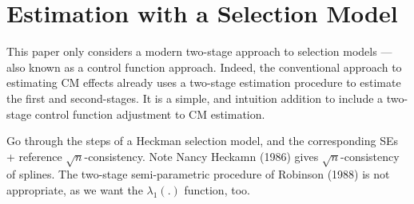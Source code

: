 \section{Estimation with a Selection Model}
\label{sec:controlfun}
This paper only considers a modern two-stage approach to selection models --- also known as a control function approach.
Indeed, the conventional approach to estimating CM effects already uses a two-stage estimation procedure to estimate the first and second-stages.
It is a simple, and intuition addition to include a two-stage control function adjustment to CM estimation.

Go through the steps of a Heckman selection model,  and the corresponding SEs + reference $\sqrt{n}$-consistency.
Note Nancy Heckamn (1986) gives $\sqrt{n}$-consistency of splines.
The two-stage semi-parametric procedure of Robinson (1988) is not appropriate, as we want the $\lambda_1(.)$ function, too.

